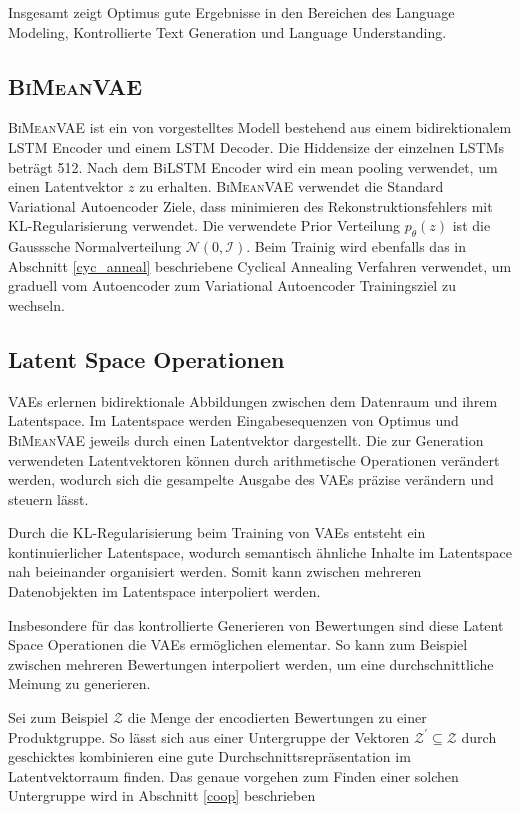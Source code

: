 Insgesamt zeigt Optimus gute Ergebnisse in den Bereichen des Language Modeling, Kontrollierte Text Generation und Language Understanding.




\subsection{\textsc{BiMeanVAE}}
\textsc{BiMeanVAE} ist ein von \citep{coop} vorgestelltes Modell bestehend aus einem bidirektionalem LSTM Encoder und einem LSTM Decoder. 
Die Hiddensize der einzelnen LSTMs beträgt 512. Nach dem BiLSTM Encoder wird ein mean pooling verwendet, um einen Latentvektor $z$ zu erhalten.
\textsc{BiMeanVAE} verwendet die Standard Variational Autoencoder Ziele, dass minimieren des Rekonstruktionsfehlers mit KL-Regularisierung verwendet.
Die verwendete Prior Verteilung $p_\theta(z)$ ist die Gausssche Normalverteilung $\mathcal{N}(0,\mathcal{I})$. 
Beim Trainig wird ebenfalls das in Abschnitt \ref{cyc_anneal} beschriebene Cyclical Annealing Verfahren verwendet, um graduell vom Autoencoder zum Variational Autoencoder Trainingsziel zu wechseln.


\subsection{Latent Space Operationen}
VAEs erlernen bidirektionale Abbildungen zwischen dem Datenraum und ihrem Latentspace. 
Im Latentspace werden Eingabesequenzen von Optimus und \textsc{BiMeanVAE} jeweils durch einen Latentvektor dargestellt.
Die zur Generation verwendeten Latentvektoren können durch arithmetische Operationen verändert werden, wodurch sich die gesampelte Ausgabe des VAEs präzise verändern und steuern lässt.

Durch die KL-Regularisierung beim Training von VAEs entsteht ein kontinuierlicher Latentspace, wodurch semantisch ähnliche Inhalte im Latentspace nah beieinander organisiert werden.
Somit kann zwischen mehreren Datenobjekten im Latentspace interpoliert werden.

Insbesondere für das kontrollierte Generieren von Bewertungen sind diese Latent Space Operationen die VAEs ermöglichen elementar.
So kann zum Beispiel zwischen mehreren Bewertungen interpoliert werden, um eine durchschnittliche Meinung zu generieren.

Sei zum Beispiel $\mathcal{Z}$ die Menge der encodierten Bewertungen zu einer Produktgruppe.
So lässt sich aus einer Untergruppe der Vektoren $\mathcal{Z}^{'} \subseteq \mathcal{Z}$ durch geschicktes kombinieren eine gute Durchschnittsrepräsentation im Latentvektorraum finden.
Das genaue vorgehen zum Finden einer solchen Untergruppe wird in Abschnitt \ref{coop} beschrieben
\pagebreak
